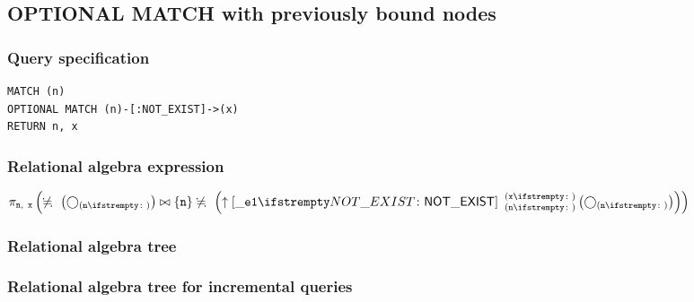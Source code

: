 \subsection{OPTIONAL MATCH with previously bound nodes}

\subsubsection*{Query specification}

\begin{lstlisting}
MATCH (n)
OPTIONAL MATCH (n)-[:NOT_EXIST]->(x)
RETURN n, x
\end{lstlisting}

\subsubsection*{Relational algebra expression}

$\projection{\var{n},~\var{x}} \left(\alldifferent{} \left(\getvertices{n}{}\right) \join \{\var{n}\} \alldifferent{} \left(\expandout{\_e1}{NOT\_EXIST}{n}{x}{} \left(\getvertices{n}{}\right)\right)\right)$

\subsubsection*{Relational algebra tree}


\subsubsection*{Relational algebra tree for incremental queries}


